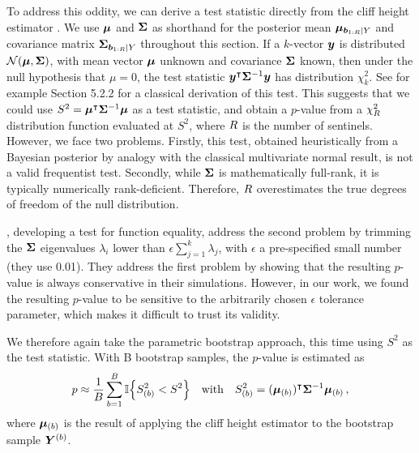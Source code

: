     To address this oddity, we can derive a test statistic directly from the cliff height estimator .
We use \(\bm{\mu}\) and \(\bm{\Sigma}\) as shorthand for the posterior mean \(\bm{\mu}_{\bm{b}_{1:R} \mid Y}\)
and covariance matrix \(\bm{\Sigma}_{\bm{b}_{1:R} \mid Y}\) throughout this section.
If a \(k\)-vector \(\bm{y}\) is distributed \(\normal\del{\muvec, \SigmaMat}\), with mean vector \(\bm{\mu}\) unknown and covariance \(\bm{\Sigma}\) known, then under the null hypothesis that \(\mu=0\), the test statistic \(\bm{y}^{\intercal} \bm{\Sigma}^{-1} \bm{y}\) has distribution \(\chi^2_k\).
See for example \cite{rencher2003methods} Section 5.2.2 for a classical derivation of this test.
This suggests that we could use \(S^2=\bm{\mu}^{\intercal} \bm{\Sigma}^{-1} \bm{\mu}\) as a test statistic,
and obtain a \(p\)-value from a \(\chi^2_R\) distribution function evaluated at \(S^2\), where \(R\) is the number of sentinels.
However, we face two problems.
Firstly, this test, obtained heuristically from a Bayesian posterior by analogy with the classical multivariate normal result, is not a valid frequentist test.
Secondly, while \(\bm{\Sigma}\) is mathematically full-rank, it is typically numerically rank-deficient.
Therefore, \(R\) overestimates the true degrees of freedom of the null distribution.

    \citet{benavoli2015gaussian}, developing a test for function equality, address the second problem by trimming the \(\bm{\Sigma}\) eigenvalues \(\lambda_i\) lower than \(\epsilon \sum_{j=1}^k \lambda_j\), with \(\epsilon\) a pre-specified small number (they use 0.01).
They address the first problem by showing that the resulting \(p\)-value is always conservative in their simulations.
However, in our work, we found the resulting \(p\)-value to be sensitive to the arbitrarily chosen \(\epsilon\) tolerance parameter, which makes it difficult to trust its validity.

    We therefore again take the parametric bootstrap approach, this time using \(S^2\) as the test statistic.
With B bootstrap samples, the \(p\)-value is estimated as
\begin{equation}
        p \approx \frac{1}{B} \sum_{b=1}^B \Ind\cbr{S_{(b)}^2 < S^2}
        \quad\text{with}\quad
        S_{(b)}^2 = (\muvec_{(b)} )\trans \SigmaMat^{-1} \muvec_{(b)}\,,
\end{equation}
where \(\bm{\mu}_{(b)}\) is the result of applying the cliff height estimator  to the bootstrap sample \(\bm{Y}^{(b)}\).

